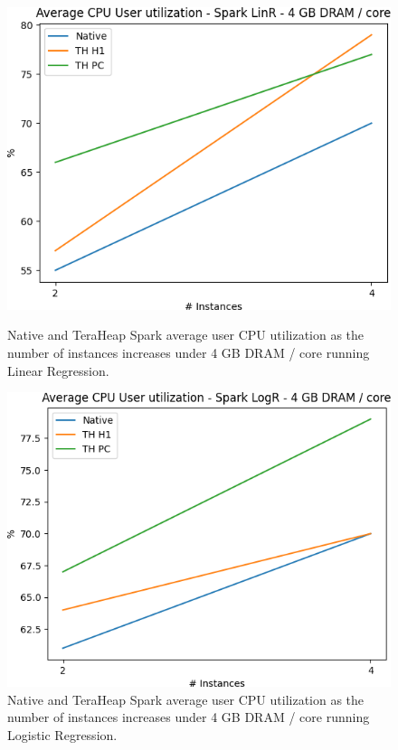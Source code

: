 \begin{figure}[thbp]
        \centering
        \includegraphics[width=\linewidth]{./fig/LINR_64_USR.png}
    \caption{Native and TeraHeap Spark average user CPU utilization 
        as the number of instances increases under 4 GB DRAM / core running Linear Regression.}
                \label{fig:linr_64_usr}
    \includegraphics[width=\linewidth]{./fig/LOGR_64_USR.png}
    \caption{Native and TeraHeap Spark average user CPU utilization
        as the number of instances increases under 4 GB DRAM / core running Logistic Regression.}
	   \label{fig:logr_64_usr}
\end{figure}

